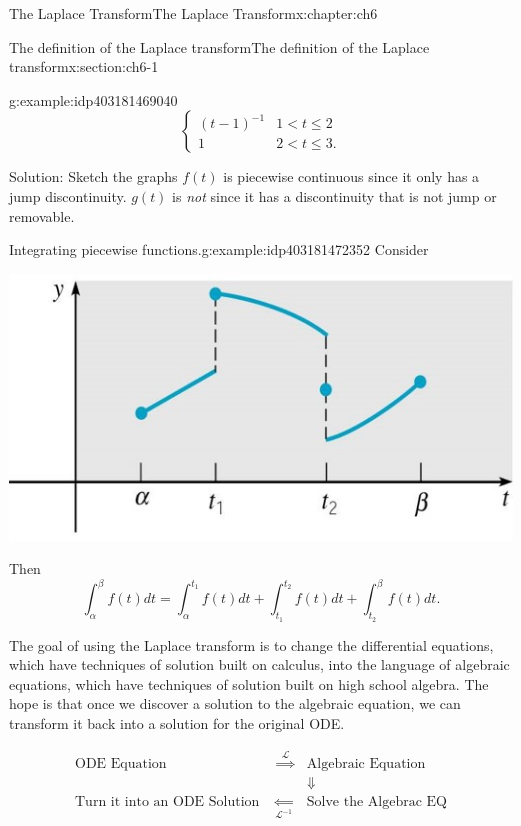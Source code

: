 \documentclass[oneside,10pt,]{book}
\numberwithin{equation}{section}
\numberwithin{equation}{section}
\newcommand{\lt}{<}
\newcommand{\amp}{&}
\begin{document}
\begin{chapterptx}{The Laplace Transform}{}{The Laplace Transform}{}{}{x:chapter:ch6}
\begin{sectionptx}{The definition of the Laplace transform}{}{The definition of the Laplace transform}{}{}{x:section:ch6-1}
\begin{example}{}{g:example:idp403181469040}
\begin{equation*}
\begin{cases}
(t-1)^{-1} \amp 1\lt t\leq2\\
1 \amp 2\lt t\leq3.
\end{cases}
\end{equation*}
%
\par
Solution: Sketch the graphs \(f(t)\) is piecewise continuous since it only has a jump discontinuity. \(g(t)\) is \emph{not} since it has a discontinuity that is not jump or removable.%
\end{example}
\begin{example}{Integrating piecewise functions.}{g:example:idp403181472352}%
Consider \begin{image}{0.25}{0.5}{0.25}%
\includegraphics[width=\linewidth]{images/6.1-1.jpg}
\end{image}%
 Then%
\begin{equation*}
\int_{\alpha}^{\beta}f(t)dt=\int_{\alpha}^{t_{1}}f(t)dt+\int_{t_{1}}^{t_{2}}f(t)dt+\int_{t_{2}}^{\beta}f(t)dt.
\end{equation*}
%
\end{example}
The goal of using the Laplace transform is to change the differential equations, which have techniques of solution built on calculus, into the language of algebraic equations, which have techniques of solution built on high school algebra. The hope is that once we discover a solution to the algebraic equation, we can transform it back into a solution for the original ODE.%
\par
%
\begin{equation*}
\begin{array}{ccc}
\text{ODE Equation} \amp \overset{\mathcal{L}}{\implies} \amp \text{Algebraic Equation}\\
\amp  \amp \Downarrow\\
\text{Turn it into an ODE Solution } \amp \underset{\mathcal{L}^{-1}}{\Longleftarrow} \amp \text{Solve the Algebrac EQ}

\end{array}
\end{equation*}
\end{sectionptx}
\end{chapterptx}
\end{document}
